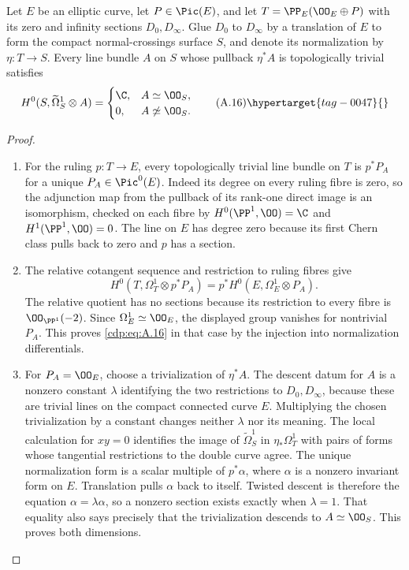 \begin{proposition}\hypertarget{tag-01AS}{}\label{cdp:st:A.4.3}

Let $E$ be an elliptic curve, let $P\in\Pic(E)$, and let $T=\PP_E(\OO_E\oplus P)$ with its zero and infinity sections $D_0,D_\infty$. Glue $D_0$ to $D_\infty$ by a translation of $E$ to form the compact normal-crossings surface $S$, and denote its normalization by $\eta:T\to S$. Every line bundle $A$ on $S$ whose pullback $\eta^*A$ is topologically trivial satisfies
\[
H^0(S,\widetilde\Omega_S^1\otimes A)=
\begin{cases}\C,&A\simeq\OO_S,\\0,&A\not\simeq\OO_S.\end{cases}
\tag{A.16}\hypertarget{tag-0047}{}\label{cdp:eq:A.16}
\]
\end{proposition}


\begin{proof}

\begin{enumerate}[label={$\langle1\rangle$\arabic*.},leftmargin=*]
\item For the ruling $p:T\to E$, every topologically trivial line bundle on $T$ is $p^*P_A$ for a unique $P_A\in\Pic^0(E)$. Indeed its degree on every ruling fibre is zero, so the adjunction map from the pullback of its rank-one direct image is an isomorphism, checked on each fibre by $H^0(\PP^1,\OO)=\C$ and $H^1(\PP^1,\OO)=0$. The line on $E$ has degree zero because its first Chern class pulls back to zero and $p$ has a section.

\item The relative cotangent sequence and restriction to ruling fibres give
\[
 H^0(T,\Omega_T^1\otimes p^*P_A)
 =p^*H^0(E,\Omega_E^1\otimes P_A).
\]
The relative quotient has no sections because its restriction to every fibre is $\OO_{\PP^1}(-2)$. Since $\Omega_E^1\simeq\OO_E$, the displayed group vanishes for nontrivial $P_A$. This proves \eqref{cdp:eq:A.16} in that case by the injection into normalization differentials.

\item For $P_A=\OO_E$, choose a trivialization of $\eta^*A$. The descent datum for $A$ is a nonzero constant $\lambda$ identifying the two restrictions to $D_0,D_\infty$, because these are trivial lines on the compact connected curve $E$. Multiplying the chosen trivialization by a constant changes neither $\lambda$ nor its meaning. The local calculation for $xy=0$ identifies the image of $\widetilde\Omega_S^1$ in $\eta_*\Omega_T^1$ with pairs of forms whose tangential restrictions to the double curve agree. The unique normalization form is a scalar multiple of $p^*\alpha$, where $\alpha$ is a nonzero invariant form on $E$. Translation pulls $\alpha$ back to itself. Twisted descent is therefore the equation $\alpha=\lambda\alpha$, so a nonzero section exists exactly when $\lambda=1$. That equality also says precisely that the trivialization descends to $A\simeq\OO_S$. This proves both dimensions.

\end{enumerate}
\end{proof}